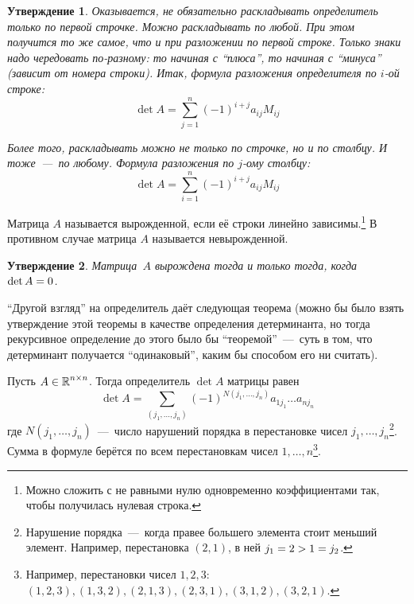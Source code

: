 \documentclass[a4paper,12pt]{article}
\newtheorem{proposition}{Утверждение}[section]
\theoremstyle{remark}
\begin{document}
  \begin{proposition}
    Оказывается, не обязательно раскладывать определитель только по первой строчке.
    Можно раскладывать \emph{по любой}.
    При этом получится \emph{то же самое}, что и при разложении по первой строке.
    Только знаки надо чередовать по-разному: то начиная с ``плюса'', то начиная с ``минуса'' (зависит от номера строки).
    Итак, формула \emph{разложения определителя по $i$-ой строке}:
    \begin{equation}
      \boxed{
        \det A = \sum\limits_{j = 1}^n (-1)^{i + j} a_{ij} M_{ij}
      }
    \end{equation}
    
    Более того, раскладывать можно не только по строчке, но и \emph{по столбцу}.
    И тоже~---~по любому.
    Формула \emph{разложения по $j$-ому столбцу}:
    \begin{equation}
      \det A = \sum\limits_{i = 1}^n (-1)^{i + j} a_{ij} M_{ij}
    \end{equation}
  \end{proposition}
  
  \begin{definition}
    Матрица $A$ называется вырожденной, если её строки линейно зависимы.\footnote{Можно сложить с не равными нулю одновременно коэффициентами так, чтобы получилась нулевая строка.}
    В противном случае матрица $A$ называется невырожденной.
  \end{definition}
  
  \begin{proposition}
    Матрица~$A$ вырождена тогда и только тогда, когда $\det A \hm= 0$.
  \end{proposition}
  
  ``Другой взгляд'' на определитель даёт следующая теорема (можно бы было взять утверждение этой теоремы в качестве определения детерминанта, но тогда рекурсивное определение до этого было бы ``теоремой''~---~суть в том, что детерминант получается ``одинаковый'', каким бы способом его ни считать).
  
  \begin{theorem}\label{theor:complete-expansion}
    Пусть $A \in \operatorname{\mathbb R}^{n \times n}$.
    Тогда определитель $\det A$ матрицы равен
    \begin{equation}
      \label{eq:complete-expansion}
      \det A = \sum_{(j_1, \ldots, j_n)} (-1)^{N(j_1, \ldots, j_n)} a_{1 j_1} \ldots a_{n j_n}
    \end{equation}
    где $N(j_1, \ldots, j_n)$~---~число нарушений порядка в перестановке чисел $j_1, \ldots, j_n$\footnote{Нарушение порядка~---~когда правее большего элемента стоит меньший элемент. Например, перестановка $(2, 1)$, в ней $j_1 \hm= 2 \hm> 1 \hm= j_2$.}.
    Сумма в формуле берётся по всем перестановкам чисел $1, \ldots, n$\footnote{Например, перестановки чисел $1, 2, 3$: $(1, 2, 3), (1, 3, 2), (2, 1, 3), (2, 3, 1), (3, 1, 2), (3, 2, 1)$.}.
  \end{theorem}
  
\end{document}
